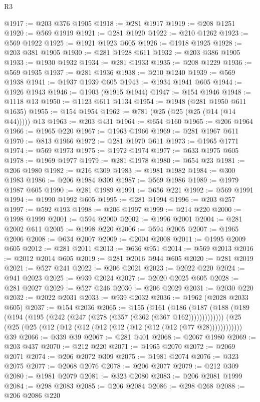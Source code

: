 \begin{lexlean}{R3}
\begin{coremodule}
@1917 := @203 @376 @1905
@1918 := @281 @1917
@1919 := @208 @1251
@1920 := @569 @1919
@1921 := @281 @1920
@1922 := @210 @1262
@1923 := @569 @1922
@1925 := @1921 @1923 @605
@1926 := @1918 @1925
@1928 := @203 @381 @1905
@1930 := @281 @1928 @611
@1932 := @203 @386 @1905
@1933 := @1930 @1932
@1934 := @281 @1933
@1935 := @208 @1229
@1936 := @569 @1935
@1937 := @281 @1936
@1938 := @210 @1240
@1939 := @569 @1938
@1941 := @1937 @1939 @605
@1943 := @1934 @1941 @605
@1944 := @1926 @1943
@1946 := @1903 (@1915 @1944)
@1947 := @154 @1946
@1948 := @1118 @13
@1950 := @1123 @611 @1134
@1954 := @1948 (@281 @1950 @611 @1635)
@1955 := @154 @1954
@1962 := @781 (@25 (@25 (@25 (@14 (@14 @44))))) @13
@1963 := @203 @431
@1964 := @654 @160
@1965 := @206 @1964
@1966 := @1965 @220
@1967 := @1963 @1966
@1969 := @281 @1967 @611
@1970 := @813 @1966
@1972 := @281 @1970 @611
@1973 := @1965 @1771
@1974 := @569 @1973
@1975 := @1972 @1974
@1977 := @633 @1975 @605
@1978 := @1969 @1977
@1979 := @281 @1978
@1980 := @654 @23
@1981 := @206 @1980
@1982 := @216 @309
@1983 := @1981 @1982
@1984 := @300 @1983
@1986 := @206 @1984 @309
@1987 := @569 @1986
@1989 := @1979 @1987 @605
@1990 := @281 @1989
@1991 := @656 @221
@1992 := @569 @1991
@1994 := @1990 @1992 @605
@1995 := @281 @1994
@1996 := @203 @257
@1997 := @592 @193
@1998 := @206 @1997
@1999 := @214 @220
@2000 := @1998 @1999
@2001 := @594 @2000
@2002 := @1996 @2001
@2004 := @281 @2002 @611
@2005 := @1998 @220
@2006 := @594 @2005
@2007 := @1965 @2006
@2008 := @634 @2007
@2009 := @2004 @2008
@2011 := @1995 @2009 @605
@2012 := @281 @2011
@2013 := @636 @951
@2014 := @569 @2013
@2016 := @2012 @2014 @605
@2019 := @281 @2016 @944 @605
@2020 := @281 @2019
@2021 := @527 @241
@2022 := @206 @2021
@2023 := @2022 @220
@2024 := @941 @2023
@2025 := @939 @2024
@2027 := @2020 @2025 @605
@2028 := @281 @2027
@2029 := @527 @246
@2030 := @206 @2029
@2031 := @2030 @220
@2032 := @2022 @2031
@2033 := @939 @2032
@2036 := @1962 (@2028 @2033 @605)
@2037 := @154 @2036
@2065 := @155
    (@161 (@186 (@187 (@188 (@189 (@194 (@195 (@242 (@247 (@278 (@357 (@362 (@367 @162)))))))))))))
    (@25 (@25 (@25 (@12 (@12 (@12 (@12 (@12 (@12 (@12 (@12 (@77 @28))))))))))))
    @39
@2066 := @339 @39
@2067 := @281 @401
@2068 := @2067 @1980
@2069 := @203 @437
@2070 := @212 @220
@2071 := @1965 @2070
@2072 := @2069 @2071
@2074 := @206 @2072 @309
@2075 := @1981 @2074
@2076 := @323 @2075
@2077 := @2068 @2076
@2078 := @206 @2077
@2079 := @212 @309
@2080 := @1981 @2079
@2081 := @323 @2080
@2083 := @206 @2081 @1999
@2084 := @298 @2083
@2085 := @206 @2084
@2086 := @298 @268
@2088 := @206 @2086 @220

\end{coremodule}
\end{lexlean}
